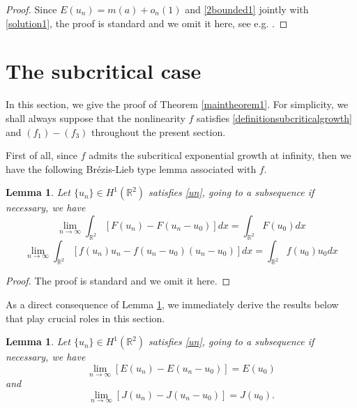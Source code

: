 \documentclass[11pt]{amsart}
\numberwithin{equation}{section}
\newtheorem{lemma}[theorem]{Lemma}
\theoremstyle{definition}
\newcommand{\R}{\mathbb{R}}
\begin{document}
\begin{proof}
Since $E(u_n)= m(a)+o_n(1)$ and \eqref{2bounded1} jointly with \eqref{solution1},
the proof is standard and we omit it here, see e.g. \cite{Figueiredo}.
\end{proof}

\section{The subcritical case}\label{Section3}

In this section, we give the proof of Theorem \ref{maintheorem1}.
For simplicity, we shall always suppose that the nonlinearity $f$ satisfies \eqref{definitionsubcriticalgrowth}
and $(f_1)-(f_3)$ throughout the present section.

First of all, since $f$ admits the subcritical exponential growth at infinity,
then we have the following Br\'{e}zis-Lieb type lemma associated with $f$.

\begin{lemma}\label{fBrezis-Lieb}
Let $\{u_n\}\in H^1(\R^2)$ satisfies \eqref{un}, going to a subsequence if necessary, we have
\begin{equation}\label{fBrezis-Lieb1}
\lim_{n\to\infty} \int_{\R^2}[F(u_n) -F(u_n-u_0)]dx = \int_{\R^2}F(u_0)dx
\end{equation}
\begin{equation}\label{fBrezis-Lieb2}
\lim_{n\to\infty} \int_{\R^2}[f(u_n)u_n -f(u_n-u_0)(u_n-u_0)]dx = \int_{\R^2}f(u_0)u_0 dx
\end{equation}
\end{lemma}

\begin{proof}
The proof is standard and we omit it here.
\end{proof}


As a direct consequence of Lemma \ref{fBrezis-Lieb}, we immediately derive the results below that play
crucial roles in this section.

\begin{lemma}\label{EBrezis-Lieb}
Let $\{u_n\}\in H^1(\R^2)$ satisfies \eqref{un}, going to a subsequence if necessary, we have
\begin{equation}\label{EBrezis-Lieb1}
  \lim_{n\to\infty} [E(u_n)-E(u_n-u_0)]=E(u_0)
\end{equation}
and
\begin{equation}\label{EBrezis-Lieb2}
\lim_{n\to\infty} [J(u_n)-J(u_n-u_0)]=J(u_0).
\end{equation}
\end{lemma}
\end{document}
